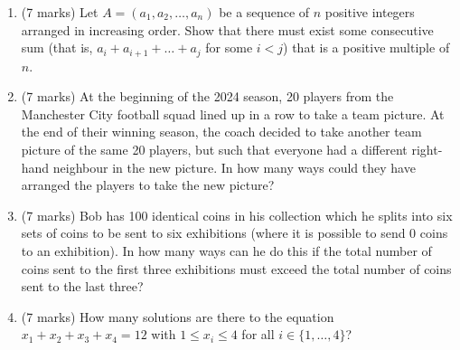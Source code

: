 \documentclass{article}
\begin{document}
\begin{enumerate}[label=(\alph*)]
    \item (7 marks) Let \( A = (a_1, a_2, \dots, a_n) \) be a sequence of \( n \) positive integers arranged in increasing order. Show that there must exist some consecutive sum (that is, \( a_i + a_{i+1} + \dots + a_j \) for some \( i < j \)) that is a positive multiple of \( n \).

    \item (7 marks) At the beginning of the 2024 season, 20 players from the Manchester City football squad lined up in a row to take a team picture. At the end of their winning season, the coach decided to take another team picture of the same 20 players, but such that everyone had a different right-hand neighbour in the new picture. In how many ways could they have arranged the players to take the new picture?

    \item (7 marks) Bob has 100 identical coins in his collection which he splits into six sets of coins to be sent to six exhibitions (where it is possible to send 0 coins to an exhibition). In how many ways can he do this if the total number of coins sent to the first three exhibitions must exceed the total number of coins sent to the last three?

    \item (7 marks) How many solutions are there to the equation \( x_1 + x_2 + x_3 + x_4 = 12 \) with \( 1 \leq x_i \leq 4 \) for all \( i \in \{1, \dots, 4\} \)?
\end{enumerate}
\end{document}

